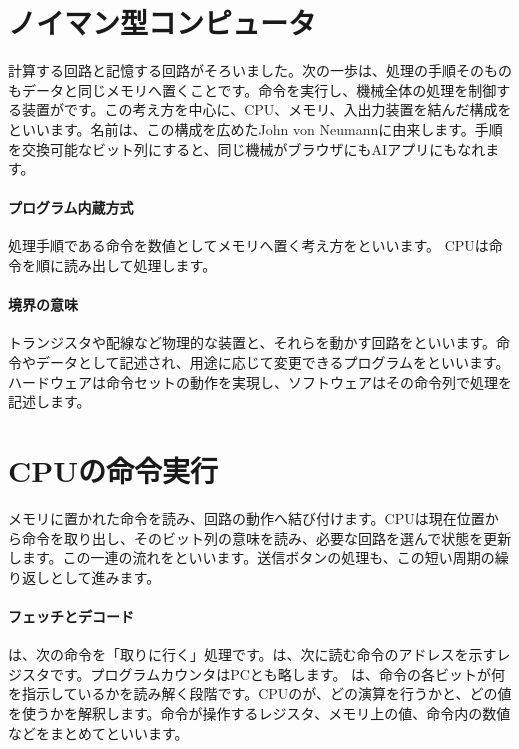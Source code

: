 \section{ノイマン型コンピュータ}
\label{sec:01-digital-computer-15}

計算する回路と記憶する回路がそろいました。次の一歩は、処理の手順そのものもデータと同じメモリへ置くことです。命令を実行し、機械全体の処理を制御する装置がです。この考え方を中心に、CPU、メモリ、入出力装置を結んだ構成をといいます。名前は、この構成を広めたJohn von Neumannに由来します。手順を交換可能なビット列にすると、同じ機械がブラウザにもAIアプリにもなれます。

\begingroup
\begingroup
      \centering
\par
\endgroup
\medskip
\begingroup
\paragraph{プログラム内蔵方式}
        処理手順である命令を数値としてメモリへ置く考え方をといいます。
        CPUは命令を順に読み出して処理します。

\paragraph{境界の意味}
        トランジスタや配線など物理的な装置と、それらを動かす回路をといいます。命令やデータとして記述され、用途に応じて変更できるプログラムをといいます。ハードウェアは命令セットの動作を実現し、ソフトウェアはその命令列で処理を記述します。

\par
\endgroup
\par
\endgroup


\section{CPUの命令実行}
\label{sec:01-digital-computer-16}

メモリに置かれた命令を読み、回路の動作へ結び付けます。CPUは現在位置から命令を取り出し、そのビット列の意味を読み、必要な回路を選んで状態を更新します。この一連の流れをといいます。送信ボタンの処理も、この短い周期の繰り返しとして進みます。

\begingroup
  \centering
  \vspace{6mm}
\begingroup
\paragraph{フェッチとデコード}
        は、次の命令を「取りに行く」処理です。は、次に読む命令のアドレスを示すレジスタです。プログラムカウンタはPCとも略します。
        は、命令の各ビットが何を指示しているかを読み解く段階です。CPUのが、どの演算を行うかと、どの値を使うかを解釈します。命令が操作するレジスタ、メモリ上の値、命令内の数値などをまとめてといいます。

